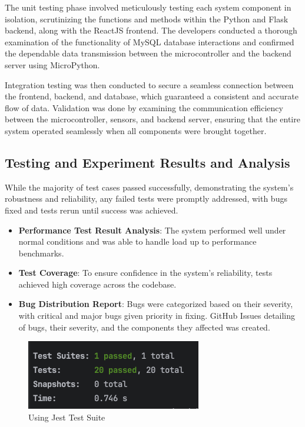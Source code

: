 The unit testing phase involved meticulously testing each system component in isolation,
scrutinizing the functions and methods within the Python and Flask backend, along
with the ReactJS frontend. %
The developers conducted a thorough examination of the functionality of MySQL database interactions and confirmed the dependable data
transmission between the microcontroller and the backend server using MicroPython. %

Integration testing was then conducted to secure a seamless connection between
the frontend, backend, and database, which guaranteed a consistent and accurate
flow of data. %
Validation was done by examining the communication efficiency between the microcontroller, sensors, and backend server, ensuring that the entire system
operated seamlessly when all components were brought together. %

\subsection{Testing and Experiment Results and Analysis}\label{subsec:testing-and-experiment-results-and-analysis}

While the majority of test cases passed successfully, demonstrating the system’s
robustness and reliability, any failed tests were promptly addressed,
with bugs fixed and tests rerun until success was achieved. %

\begin{itemize}
    \item \textbf{Performance Test Result Analysis}: The system performed well
          under normal conditions and was able to handle load up to performance benchmarks. %
    \item \textbf{Test Coverage}: To ensure confidence in the system’s reliability,
          tests achieved high coverage across the codebase. %
    \item \textbf{Bug Distribution Report}: Bugs were categorized based on their
          severity, with critical and major bugs given priority in fixing.  %
          GitHub Issues detailing of bugs, their severity, and the components
          they affected was created. %
\end{itemize}

\begin{figure}[htbp]
    \centering
    \includegraphics[width=1\linewidth]{datasets/images/Jest-Test-Suite.png}
    \caption{Using Jest Test Suite}
    \label{fig:figure2}

\end{figure}

